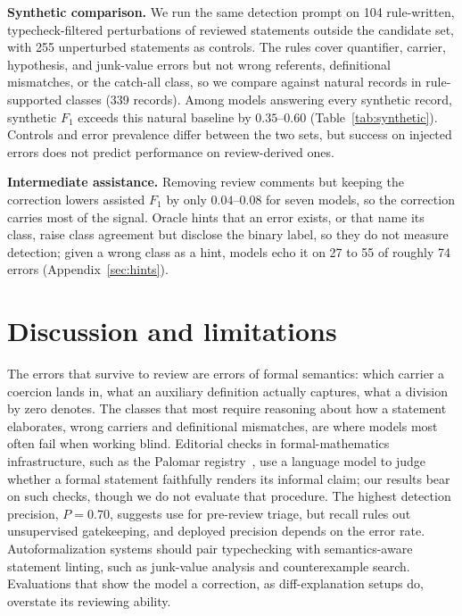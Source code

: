 \documentclass{article}
\begin{document}
\textbf{Synthetic comparison.} We run the same detection prompt on 104
rule-written, typecheck-filtered perturbations of reviewed statements outside
the candidate set, with 255 unperturbed statements as controls. The rules
cover quantifier, carrier, hypothesis, and junk-value errors but not wrong
referents, definitional mismatches, or the catch-all class, so we compare
against natural records in rule-supported classes (339 records). Among models
answering every synthetic record, synthetic $F_1$ exceeds this natural
baseline by $0.35$--$0.60$ (Table~\ref{tab:synthetic}). Controls and error
prevalence differ between the two sets, but success on injected errors does
not predict performance on review-derived ones.



\textbf{Intermediate assistance.} Removing review comments but keeping the
correction lowers assisted $F_1$ by only $0.04$--$0.08$ for seven models, so
the correction carries most of the signal. Oracle hints that an error exists,
or that name its class, raise class agreement but disclose the binary label,
so they do not measure detection; given a wrong class as a hint, models echo
it on 27 to 55 of roughly 74 errors (Appendix~\ref{sec:hints}).

\begin{table}[t]\centering\small
{}
\caption{Detection with file context versus unaugmented detection. All seven
context runs score 360 records. Pooled Lean-semantics recall counts correct
assignments in the Lean-semantics group defined in Section~\ref{sec:eval}.}
\label{tab:context}
\end{table}

\section{Discussion and limitations}
The errors that survive to review are errors of formal semantics: which
carrier a coercion lands in, what an auxiliary definition actually captures,
what a division by zero denotes. The classes that most require reasoning
about how a statement elaborates, wrong carriers and definitional mismatches,
are where models most often fail when working blind. Editorial checks in
formal-mathematics infrastructure, such as the Palomar
registry~\citep{tao2026palomar}, use a language model to judge whether a
formal statement faithfully renders its informal claim; our results bear on
such checks, though we do not evaluate that procedure. The highest detection
precision, $P=0.70$, suggests use for pre-review triage, but recall rules out
unsupervised gatekeeping, and deployed precision depends on the error rate.
Autoformalization systems should pair typechecking with semantics-aware
statement linting, such as junk-value analysis and counterexample search.
Evaluations that show the model a correction, as diff-explanation setups do,
overstate its reviewing ability.
\end{document}
